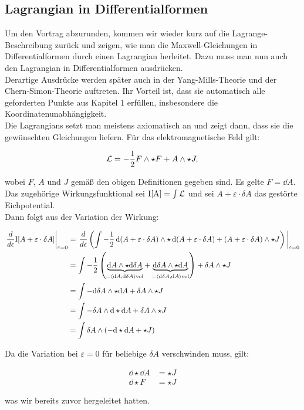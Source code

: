 \subsection{Lagrangian in Differentialformen}

Um den Vortrag abzurunden, kommen wir wieder kurz auf die Lagrange-Beschreibung zurück und zeigen, wie man die Maxwell-Gleichungen in Differentialformen durch einen Lagrangian herleitet. Dazu muss man nun auch den Lagrangian in Differentialformen ausdrücken. \\
Derartige Ausdrücke werden später auch in der Yang-Mills-Theorie und der Chern-Simon-Theorie auftreten. Ihr Vorteil ist, dass sie automatisch alle geforderten Punkte aus Kapitel 1 erfüllen, insbesondere die Koordinatenunabhängigkeit. \\

Die Lagrangians setzt man meistens axiomatisch an und zeigt dann, dass sie die gewünschten Gleichungen liefern. Für das elektromagnetische Feld gilt:

\begin{align}
\mathcal{L} = - \frac{1}{2} F \wedge \star F + A \wedge \star J,
\end{align}

wobei $F$, $A$ und $J$ gemäß den obigen Definitionen gegeben sind. Es gelte $F = \dd A$. \\

Das zugehörige Wirkungsfunktional sei $\text{I[A]}=\int \mathcal{L}$ und sei $A + \varepsilon \cdot \delta A$ das gestörte Eichpotential. \\
Dann folgt aus der Variation der Wirkung: 

\begin{align*}
\eval{\frac{d}{d \epsilon} \text{I}[A + \varepsilon \cdot \delta A]}_{\varepsilon=0} &= \eval{\frac{d}{d \epsilon} \left( \int - \frac{1}{2} \dd(A + \varepsilon \cdot \delta A) \w \star \dd(A + \varepsilon \cdot \delta A) + (A + \varepsilon \cdot \delta A) \w \star J \right)}_{\varepsilon=0} \\
&= \int - \frac{1}{2} \left(\underbrace{\dd A  \w \star \dd \delta A}_{=  \left< \dd A, \dd \delta A \right>\text{vol}}  + \underbrace{\dd \delta A \w \star \dd A}_{=  \left< \dd \delta A, \dd A \right>\text{vol}} \right) + \delta A \w \star J \\
&= \int - \dd \delta A \w \star \dd A + \delta A \w \star J  \\
&= \int - \delta A \w \dd \star \dd A + \delta A \w \star J \\
&= \int \delta A \w \left( - \dd \star \dd A + \star J \right)
\end{align*}

Da die Variation bei $\varepsilon = 0$ für beliebige $\delta A$ verschwinden muss, gilt: 

\begin{align}
\dd \star \dd A &= \star J \\
\dd \star F &= \star J
\end{align}

was wir bereits zuvor hergeleitet hatten.